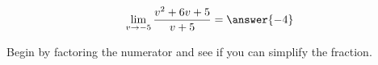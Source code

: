 \documentclass{ximera}
\author{Bart Snapp}
\begin{document}
\begin{exercise}

\[
\lim_{v\to -5 } \frac{v^2+6 v+5}{v+5} = \answer{-4}
\]
\begin{hint}
Begin by factoring the numerator and see if you can simplify the fraction.
\end{hint}
\end{exercise}
\end{document}
